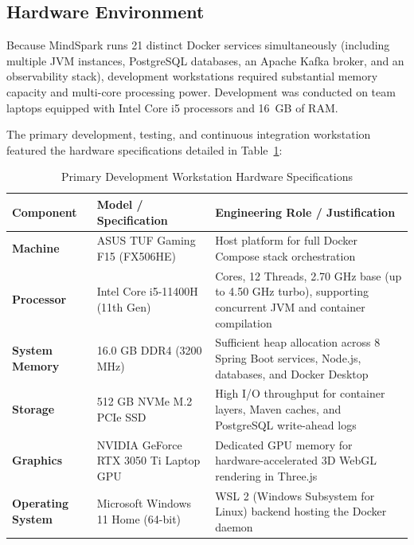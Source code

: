 \subsection{Hardware Environment}
\label{subsec:hardware_env}

Because MindSpark runs 21 distinct Docker services simultaneously (including multiple JVM instances, PostgreSQL databases, an Apache Kafka broker, and an observability stack), development workstations required substantial memory capacity and multi-core processing power. Development was conducted on team laptops equipped with Intel Core i5 processors and 16~GB of RAM.

\noindent The primary development, testing, and continuous integration workstation featured the hardware specifications detailed in Table~\ref{tab:hardware_specs}:

\begin{table}[H]
\centering
\caption{Primary Development Workstation Hardware Specifications}
\label{tab:hardware_specs}
\small
\begin{tabularx}{\textwidth}{@{}l>{\raggedright}p{4.2cm}>{\raggedright\arraybackslash}X@{}}
\toprule
\textbf{Component} & \textbf{Model / Specification} & \textbf{Engineering Role / Justification} \\
\midrule
\textbf{Machine} & ASUS TUF Gaming F15 (FX506HE) & Host platform for full Docker Compose stack orchestration \\
\textbf{Processor} & Intel Core i5-11400H (11th Gen) & 6 Cores, 12 Threads, 2.70 GHz base (up to 4.50 GHz turbo), supporting concurrent JVM and container compilation \\
\textbf{System Memory} & 16.0 GB DDR4 (3200 MHz) & Sufficient heap allocation across 8 Spring Boot services, Node.js, databases, and Docker Desktop \\
\textbf{Storage} & 512 GB NVMe M.2 PCIe SSD & High I/O throughput for container layers, Maven caches, and PostgreSQL write-ahead logs \\
\textbf{Graphics} & NVIDIA GeForce RTX 3050 Ti Laptop GPU & Dedicated GPU memory for hardware-accelerated 3D WebGL rendering in Three.js \\
\textbf{Operating System} & Microsoft Windows 11 Home (64-bit) & WSL 2 (Windows Subsystem for Linux) backend hosting the Docker daemon \\
\bottomrule
\end{tabularx}
\end{table}


